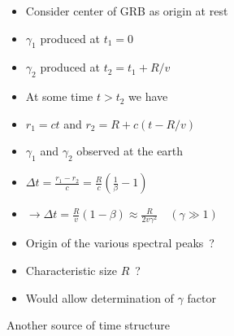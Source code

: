 \newpage

\begin{itemize}
\item Consider center of GRB as origin at rest
\item[] $\gamma_{1}$ produced at $t_{1}=0$
\item[] $\gamma_{2}$ produced at $t_{2}=t_{1}+R/v$
\item[] At some time $t>t_{2}$ we have
\item[] $r_{1}=ct$ and $r_{2}=R+c(t-R/v)$
\item $\gamma_{1}$ and $\gamma_{2}$ observed at the earth
\item[] $\displaystyle \Delta t=\frac{r_{1}-r_{2}}{c}=\frac{R}{c}\left(\frac{1}{\beta}-1\right)$
\item[] $\displaystyle \rightarrow \Delta t=\frac{R}{v}(1-\beta)
          \approx \frac{R}{2v \gamma^{2}} \quad (\gamma \gg 1)$
\item[] {\blue Origin of the various spectral peaks~?}
\item Characteristic size $R$~?
\item[] Would allow determination of $\gamma$ factor
\end{itemize}

\Tr
\begin{center}
{\red Another source of time structure}
\end{center}

\vspace*{0.5cm}

